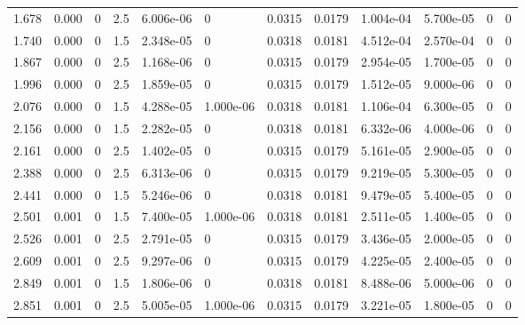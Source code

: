 \documentclass[preview]{standalone}
\begin{document}
{{\begin{tabular}{L{1.2cm}C{1.2cm} C{0.3cm}C{0.5cm} C{1.4cm}C{1.4cm} C{1.4cm}C{1.4cm} C{1.6cm}C{1.6cm} C{1.6cm}C{1.6cm}}
  1.678  &  0.000  & 0     & 2.5 &  6.006e-06  & 0  &  0.0315&   0.0179& 1.004e-04 & 5.700e-05   &  0 & 0  \\ 
  1.740  &  0.000  & 0     & 1.5 &  2.348e-05  & 0  &  0.0318&   0.0181& 4.512e-04 & 2.570e-04   &  0 & 0  \\ 
  1.867  &  0.000  & 0     & 2.5 &  1.168e-06  & 0  &  0.0315&   0.0179& 2.954e-05 & 1.700e-05   &  0 & 0  \\ 
  1.996  &  0.000  & 0     & 2.5 &  1.859e-05  & 0  &  0.0315&   0.0179& 1.512e-05 & 9.000e-06   &  0 & 0  \\ 
  2.076  &  0.000  & 0     & 1.5 &  4.288e-05  & 1.000e-06  &  0.0318&   0.0181& 1.106e-04 & 6.300e-05   &  0 & 0  \\ 
  2.156  &  0.000  & 0     & 1.5 &  2.282e-05  & 0  &  0.0318&   0.0181& 6.332e-06 & 4.000e-06   &  0 & 0  \\ 
  2.161  &  0.000  & 0     & 2.5 &  1.402e-05  & 0  &  0.0315&   0.0179& 5.161e-05 & 2.900e-05   &  0 & 0  \\ 
  2.388  &  0.000  & 0     & 2.5 &  6.313e-06  & 0  &  0.0315&   0.0179& 9.219e-05 & 5.300e-05   &  0 & 0  \\ 
  2.441  &  0.000  & 0     & 1.5 &  5.246e-06  & 0  &  0.0318&   0.0181& 9.479e-05 & 5.400e-05   &  0 & 0  \\ 
  2.501  &  0.001  & 0     & 1.5 &  7.400e-05  & 1.000e-06  &  0.0318&   0.0181& 2.511e-05 & 1.400e-05   &  0 & 0  \\ 
  2.526  &  0.001  & 0     & 2.5 &  2.791e-05  & 0  &  0.0315&   0.0179& 3.436e-05 & 2.000e-05   &  0 & 0  \\ 
  2.609  &  0.001  & 0     & 2.5 &  9.297e-06  & 0  &  0.0315&   0.0179& 4.225e-05 & 2.400e-05   &  0 & 0  \\ 
  2.849  &  0.001  & 0     & 1.5 &  1.806e-06  & 0  &  0.0318&   0.0181& 8.488e-06 & 5.000e-06   &  0 & 0  \\ 
  2.851  &  0.001  & 0     & 2.5 &  5.005e-05  & 1.000e-06  &  0.0315&   0.0179& 3.221e-05 & 1.800e-05   &  0 & 0  \\ 
\hline 
\end{tabular} 

}}
\end{document}
